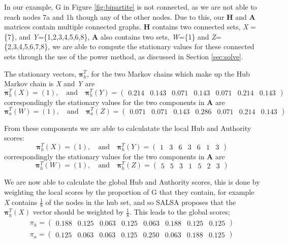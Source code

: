 \documentclass[11pt]{report}
\begin{document}
In our example, G in Figure \ref{fig:bipartite} is not connected, as we are not able to reach nodes 7a and 1h though any of the other nodes. Due to this, our \textbf{H} and \textbf{A} matrices contain multiple connected graphs. \textbf{H} contains two connected sets, \textit{X} = \{7\}, and \textit{Y}=\{1,2,3,4,5,6,8\}, \textbf{A} also contains two sets, \textit{W}=\{1\} and \textit{Z}=\{2,3,4,5,6,7,8\}, we are able to compute the stationary values for these connected sets through the use of the power method, as discussed in Section \ref{sec:solve}.

The stationary vectors, $\boldsymbol\pi_h^T$, for the two Markov chains which make up the Hub Markov chain is \textit{X} and \textit{Y} are 
\[\boldsymbol\pi_h^T (X) = (1)\mathrm{,}\quad\mathrm{and}\quad
\boldsymbol\pi_h^T (Y) =
\left( \begin{array} {ccccccc}
0.214 & 0.143 & 0.071 & 0.143 & 0.071 & 0.214 & 0.143 
\end{array}\right)\] correspondingly the stationary values for the two components in \textbf{A} are
\[\boldsymbol\pi_a^T (W) = (1)\mathrm{,}\quad\mathrm{and}\quad
\boldsymbol\pi_a^T (Z) =
\left( \begin{array} {ccccccc}
0.071 & 0.071 & 0.143 & 0.286 & 0.071 & 0.214 & 0.143 
\end{array}\right)\]

From these components we are able to calculatate the local Hub and Authority scores:
\[\boldsymbol\pi_h^T (X) = (1)\mathrm{,}\quad\mathrm{and}\quad
\boldsymbol\pi_h^T (Y) =
\left( \begin{array} {ccccccc}
1 & 3 & 6 & 3 & 6 & 1 & 3 
\end{array}\right)\]correspondingly the stationary values for the two components in \textbf{A} are
\[\boldsymbol\pi_h^T (W) = (1)\mathrm{,}\quad\mathrm{and}\quad
\boldsymbol\pi_h^T (Z) =
\left( \begin{array} {ccccccc}
5 & 5 & 3 & 1 & 5 & 2 & 3 
\end{array}\right)\]

We are now able to calculate the global Hub and Authority scores, this is done by weighting the local scores by the proportion of G that they contain, for example \textit{X} contains $\frac{1}{8}$ of the nodes in the hub set, and so SALSA proposes that the $\boldsymbol\pi_h^T(X)$ vector should be weighted by $\frac{1}{8}$. This leads to the global scores;
\begin{eqnarray*}
\pi_h = \left( \begin{array} {cccccccc}
0.188 & 0.125 & 0.063 & 0.125 & 0.063 & 0.188 & 0.125 & 0.125
\end{array}\right) \\
\pi_a = \left( \begin{array} {cccccccc}
0.125 & 0.063 & 0.063 & 0.125 & 0.250 & 0.063 & 0.188 & 0.125
\end{array}\right)
\end{eqnarray*}
\end{document}

